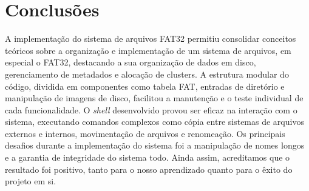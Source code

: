 \documentclass[
    12pt,				%
    oneside,   	        %
    a4paper,			%
    english,			%
    french,				%
    spanish,			%
    brazil,				%
    ]{pacotes/abntex2}
\begin{document}

\section{Conclusões}
\label{sec:conclusoes}
A implementação do sistema de arquivos FAT32 permitiu consolidar conceitos teóricos sobre a organização e implementação de um sistema de arquivos, em especial o FAT32, destacando a sua organização de dados em disco, gerenciamento de metadados e alocação de clusters. A estrutura modular do código, dividida em componentes como tabela FAT, entradas de diretório e manipulação de imagens de disco, facilitou a manutenção e o teste individual de cada funcionalidade. O \textit{shell} desenvolvido provou ser eficaz na interação com o sistema, executando comandos complexos como cópia entre sistemas de arquivos externos e internos, movimentação de arquivos e renomeação. Os principais desafios durante a implementação do sistema foi a manipulação de nomes longos e a garantia de integridade do sistema todo. Ainda assim, acreditamos que o resultado foi positivo, tanto para o nosso aprendizado quanto para o êxito do projeto em si.

\postextual
\renewcommand{\bibsection}{%
\section{\bibname}
\bibmark
\prebibhook}


\end{document}
